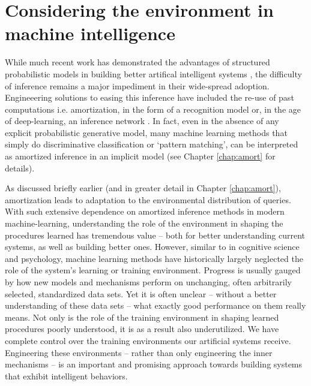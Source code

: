 
\section*{Considering the environment in machine intelligence}

While much recent work has demonstrated the advantages of structured probabilistic models in building better artifical intelligent systems \cite{lake2015human, del2013understanding, zhao2011image, steyvers2007probabilistic}, the difficulty of inference remains a major impediment in their wide-spread adoption. Engineeering solutions to easing this inference have included the re-use of past computations i.e. amortization, in the form of a recognition model\cite{dayan1995helmholtz, kingma2014auto} or, in the age of deep-learning, an inference network \citep{kulkarni2015picture, mnih2014neural, rezende2015variational, paige2016inference}. In fact, even in the absence of any explicit probabilistic generative model, many machine learning methods that simply do discriminative classification or `pattern matching', can be interpreted as amortized inference in an implicit model (see Chapter \ref{chap:amort} for details). 

As discussed briefly earlier (and in greater detail in Chapter \ref{chap:amort}), amortization leads to adaptation to the environmental distribution of queries. With such extensive dependence on amortized inference methods in modern machine-learning, understanding the role of the environment in shaping the procedures learned has tremendous value -- both for better understanding current systems, as well as building better ones. However, similar to in cognitive science and psychology, machine learning methods have historically largely neglected the role of the system's learning or training environment. Progress is usually gauged by how new models and mechanisms perform on unchanging, often arbitrarily selected, standardized data sets. Yet it is often unclear -- without a better understanding of these data sets -- what exactly good performance on them really means. Not only is the role of the training environment in shaping learned procedures poorly understood, it is as a result also underutilized. We have complete control over the training environments our artificial systems receive. Engineering these environments -- rather than only engineering the inner mechanisms -- is an important and promising approach towards building systems that exhibit intelligent behaviors.

